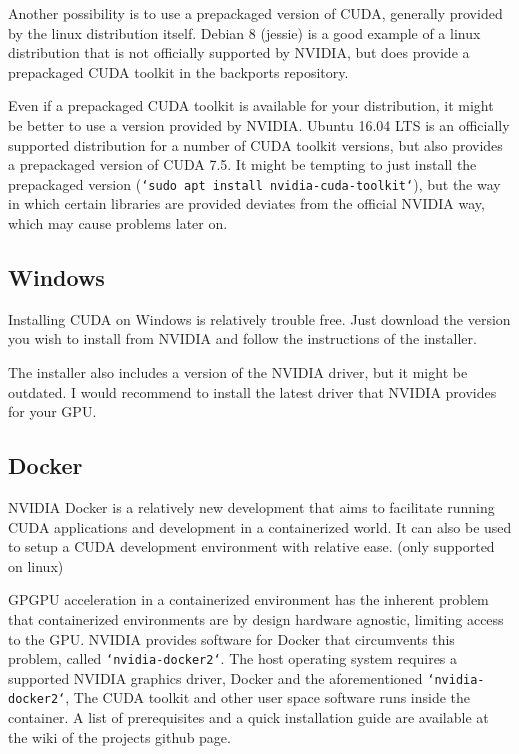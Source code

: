 Another possibility is to use a prepackaged version of CUDA, generally provided by the linux distribution itself. Debian 8 (jessie) is a good example of a linux distribution that is not officially supported by NVIDIA, but does provide a prepackaged CUDA toolkit in the backports repository.\vspace{5mm}

Even if a prepackaged CUDA toolkit is available for your distribution, it might be better to use a version provided by NVIDIA. Ubuntu 16.04 LTS is an officially supported distribution for a number of CUDA toolkit versions, but also provides a prepackaged version of CUDA 7.5. It might be tempting to just install the prepackaged version (\texttt{`sudo apt install nvidia-cuda-toolkit`}), but the way in which certain libraries are provided deviates from the official NVIDIA way, which may cause problems later on.

\newpage

\subsection*{Windows}

\hspace{4mm}Installing CUDA on Windows is relatively trouble free. Just download the version you wish to install from NVIDIA and follow the instructions of the installer.\vspace{5mm}

The installer also includes a version of the NVIDIA driver, but it might be outdated. I would recommend to install the latest driver that NVIDIA provides for your GPU.

\subsection*{Docker}

\hspace{4mm}NVIDIA Docker is a relatively new development that aims to facilitate running CUDA applications and development in a containerized world. It can also be used to setup a CUDA development environment with relative ease. (only supported on linux)\vspace{5mm}

GPGPU acceleration in a containerized environment has the inherent problem that containerized environments are by design hardware agnostic, limiting access to the GPU. NVIDIA provides software for Docker that circumvents this problem, called \texttt{`nvidia-docker2`}. The host operating system requires a supported NVIDIA graphics driver, Docker and the aforementioned \texttt{`nvidia-docker2`}, The CUDA toolkit and other user space software runs inside the container. A list of prerequisites and a quick installation guide are available at the wiki of the projects github page\autocite[]{nvidia_docker_git}.\vspace{5mm}


